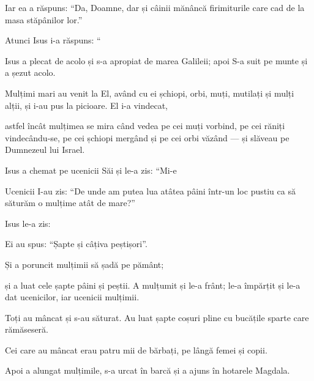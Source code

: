 {\par }{\PP {}Iar ea a răspuns: “Da, Doamne, dar și câinii mănâncă firimiturile care cad de la masa stăpânilor lor.”


\par }{\PP {}Atunci Isus i-a răspuns: “{}


\par }{\PP {}Isus a plecat de acolo și s-a apropiat de marea Galileii; apoi S-a suit pe munte și a șezut acolo.

Mulțimi mari au venit la El, având cu ei șchiopi, orbi, muți, mutilați și mulți alții, și i-au pus la picioare. El i-a vindecat,

astfel încât mulțimea se mira când vedea pe cei muți vorbind, pe cei răniți vindecându-se, pe cei șchiopi mergând și pe cei orbi văzând — și slăveau pe Dumnezeul lui Israel.


\par }{\PP {}Isus a chemat pe ucenicii Săi și le-a zis: “Mi-e
{}


\par }{\PP {}Ucenicii I-au zis: “De unde am putea lua atâtea pâini într-un loc pustiu ca să săturăm o mulțime atât de mare?”


\par }{\PP {}Isus le-a zis:
{}

\par }{\PP Ei au spus: “Șapte și câțiva peștișori”.


\par }{\PP {}Și a poruncit mulțimii să șadă pe pământ;

și a luat cele șapte pâini și peștii. A mulțumit și le-a frânt; le-a împărțit și le-a dat ucenicilor, iar ucenicii mulțimii.

Toți au mâncat și s-au săturat. Au luat șapte coșuri pline cu bucățile sparte care rămăseseră.

Cei care au mâncat erau patru mii de bărbați, pe lângă femei și copii.

Apoi a alungat mulțimile, s-a urcat în barcă și a ajuns în hotarele Magdala.



\par }
